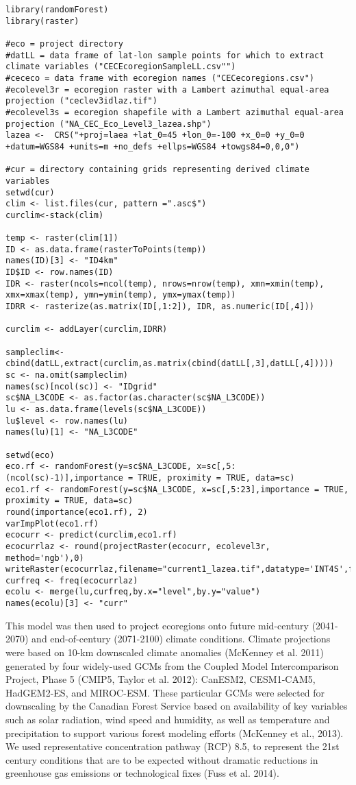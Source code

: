 \documentclass[]{article}
\begin{document}
\begin{verbatim}
library(randomForest)
library(raster)

#eco = project directory
#datLL = data frame of lat-lon sample points for which to extract climate variables ("CECEcoregionSampleLL.csv"")
#cececo = data frame with ecoregion names ("CECecoregions.csv")
#ecolevel3r = ecoregion raster with a Lambert azimuthal equal-area projection ("ceclev3idlaz.tif")
#ecolevel3s = ecoregion shapefile with a Lambert azimuthal equal-area projection ("NA_CEC_Eco_Level3_lazea.shp")
lazea <-  CRS("+proj=laea +lat_0=45 +lon_0=-100 +x_0=0 +y_0=0 +datum=WGS84 +units=m +no_defs +ellps=WGS84 +towgs84=0,0,0")

#cur = directory containing grids representing derived climate variables
setwd(cur)
clim <- list.files(cur, pattern =".asc$")
curclim<-stack(clim)

temp <- raster(clim[1])
ID <- as.data.frame(rasterToPoints(temp))
names(ID)[3] <- "ID4km"
ID$ID <- row.names(ID)
IDR <- raster(ncols=ncol(temp), nrows=nrow(temp), xmn=xmin(temp), xmx=xmax(temp), ymn=ymin(temp), ymx=ymax(temp))
IDRR <- rasterize(as.matrix(ID[,1:2]), IDR, as.numeric(ID[,4]))

curclim <- addLayer(curclim,IDRR)

sampleclim<-cbind(datLL,extract(curclim,as.matrix(cbind(datLL[,3],datLL[,4]))))
sc <- na.omit(sampleclim)
names(sc)[ncol(sc)] <- "IDgrid"
sc$NA_L3CODE <- as.factor(as.character(sc$NA_L3CODE))
lu <- as.data.frame(levels(sc$NA_L3CODE))
lu$level <- row.names(lu)
names(lu)[1] <- "NA_L3CODE"

setwd(eco)
eco.rf <- randomForest(y=sc$NA_L3CODE, x=sc[,5:(ncol(sc)-1)],importance = TRUE, proximity = TRUE, data=sc)
eco1.rf <- randomForest(y=sc$NA_L3CODE, x=sc[,5:23],importance = TRUE, proximity = TRUE, data=sc)
round(importance(eco1.rf), 2)
varImpPlot(eco1.rf) 
ecocurr <- predict(curclim,eco1.rf)
ecocurrlaz <- round(projectRaster(ecocurr, ecolevel3r, method='ngb'),0)
writeRaster(ecocurrlaz,filename="current1_lazea.tif",datatype='INT4S',format="GTiff",overwrite=TRUE)
curfreq <- freq(ecocurrlaz)
ecolu <- merge(lu,curfreq,by.x="level",by.y="value")
names(ecolu)[3] <- "curr"
\end{verbatim}

This model was then used to project ecoregions onto future mid-century
(2041-2070) and end-of-century (2071-2100) climate conditions. Climate
projections were based on 10-km downscaled climate anomalies (McKenney
et al. 2011) generated by four widely-used GCMs from the Coupled Model
Intercomparison Project, Phase 5 (CMIP5, Taylor et al. 2012): CanESM2,
CESM1-CAM5, HadGEM2-ES, and MIROC-ESM. These particular GCMs were
selected for downscaling by the Canadian Forest Service based on
availability of key variables such as solar radiation, wind speed and
humidity, as well as temperature and precipitation to support various
forest modeling efforts (McKenney et al., 2013). We used representative
concentration pathway (RCP) 8.5, to represent the 21st century
conditions that are to be expected without dramatic reductions in
greenhouse gas emissions or technological fixes (Fuss et al. 2014).
\end{document}
